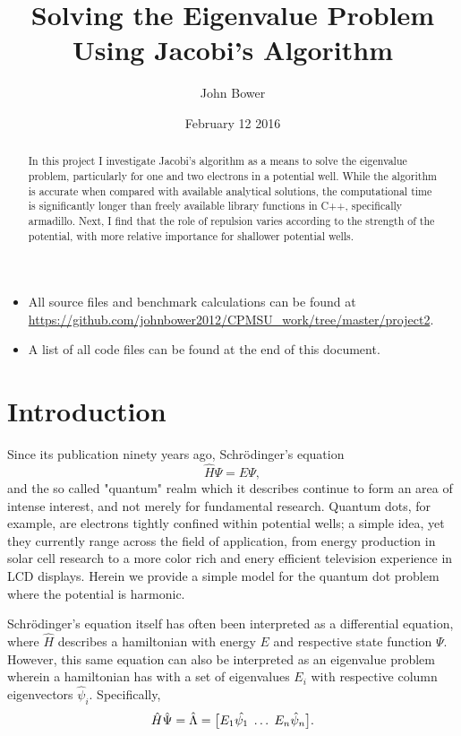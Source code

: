 \documentclass[11pt,a4paper]{article}
\title{Solving the Eigenvalue Problem Using Jacobi's Algorithm}
\author{John Bower}
\date{February 12 2016}
\begin{document}
\maketitle

\begin{abstract}

In this project I investigate Jacobi's algorithm as a means to solve the eigenvalue problem, particularly for one and two electrons in a potential well. While the algorithm is accurate when compared with available analytical solutions, the computational time is significantly longer than freely available library functions in C++, specifically armadillo. Next, I find that the role of repulsion varies according to the strength of the potential, with more relative importance for shallower potential wells.

\end{abstract}

\begin{itemize}
\item All source files and benchmark calculations can be found at \url{https://github.com/johnbower2012/CPMSU_work/tree/master/project2}.
\item A list of all code files can be found at the end of this document.
\end{itemize}

\section{Introduction}

Since its publication ninety years ago, Schr{\"o}dinger's equation
\begin{equation}
\hat{H}\Psi = E\Psi,
\end{equation}
and the so called "quantum" realm which it describes continue to form an area of intense interest, and not merely for fundamental research. Quantum dots, for example, are electrons tightly confined within potential wells; a simple idea, yet they currently range across the field of application, from energy production in solar cell research to a more color rich and enery efficient television experience in LCD displays. Herein we provide a simple model for the quantum dot problem where the potential is harmonic. 

Schr{\"o}dinger's equation itself has often been interpreted as a differential equation, where $\hat{H}$ describes a hamiltonian with energy $E$ and respective state function $\Psi$. However, this same equation can also be interpreted as an eigenvalue problem wherein a hamiltonian has with a set of eigenvalues ${E_i}$ with respective column eigenvectors ${\hat{\psi}_i}$. Specifically,
\begin{equation}
\hat{H}\hat{\Psi} = \hat{\Lambda} = \big[E_1\hat{\psi_1} \hspace{0.1 cm} \dots \hspace{0.1 cm} E_n\hat{\psi}_n\big].
\end{equation}
\end{document}
